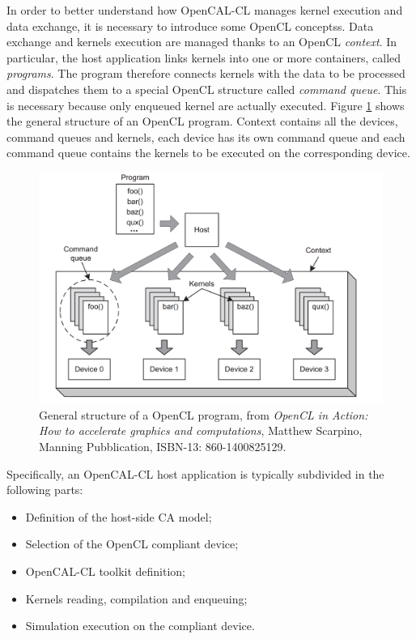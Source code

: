 In order to better understand how OpenCAL-CL manages kernel execution
and data exchange, it is necessary to introduce some OpenCL
conceptss. Data exchange and kernels execution are managed thanks to
an OpenCL \emph{context}. In particular, the host application links
kernels into one or more containers, called \emph{programs}. The
program therefore connects kernels with the data to be processed and
dispatches them to a special OpenCL structure called \emph{command
  queue}. This is necessary because only enqueued kernel are actually
executed. Figure \ref{fig:GeneralStructure} shows the general
structure of an OpenCL program. Context contains all the devices,
command queues and kernels, each device has its own command queue and
each command queue contains the kernels to be executed on the
corresponding device.

\begin{figure}[htp]
  \begin{center}
    \includegraphics[width=12cm]{./images/OpenCAL-CL/kernelDistribution}
    \caption{General structure of a OpenCL program, from \emph{OpenCL
        in Action: How to accelerate graphics and computations},
      Matthew Scarpino, Manning Pubblication, ISBN-13:
      860-1400825129.}
    \label{fig:GeneralStructure}
  \end{center}
\end{figure}

Specifically, an OpenCAL-CL host application is typically
subdivided in the following parts:
\begin{itemize}
\item Definition of the host-side CA model;
\item Selection of the OpenCL compliant device;
\item OpenCAL-CL toolkit definition;
\item Kernels reading, compilation and enqueuing;
\item Simulation execution on the compliant device.
\end{itemize}

